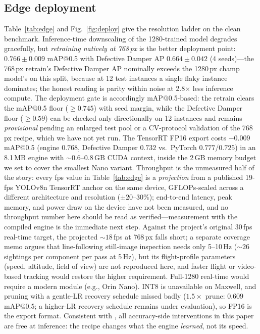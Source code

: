 \documentclass[conference]{IEEEtran}
\makeatletter
\newcommand{\dd}{Defective Damper}
\newcommand{\map}{mAP@0.5}
\makeatother
\begin{document}
\subsection{Edge deployment}
\label{sec:edge}
Table~\ref{tab:edge} and Fig.~\ref{fig:deploy} give the resolution ladder on the clean benchmark. Inference-time downscaling of the 1280-trained model degrades gracefully, but \emph{retraining natively at 768\,px} is the better deployment point: $0.766\pm0.009$ \map{} with \dd{} AP $0.664\pm0.042$ (4 seeds)---the 768\,px retrain's \dd{} AP nominally exceeds the 1280\,px champ model's on this split, because at 12 test instances a single flaky instance dominates; the honest reading is parity within noise at 2.8$\times$ less inference compute. The deployment gate is accordingly \map{}-based: the retrain clears the \map{} floor ($\geq0.745$) with seed margin, while the \dd{} floor ($\geq0.59$) can be checked only directionally on 12 instances and remains \emph{provisional} pending an enlarged test pool or a CV-protocol validation of the 768\,px recipe, which we have not yet run. The TensorRT FP16 export costs $-0.009$ \map{} (engine $0.768$, \dd{} $0.732$ vs.\ PyTorch $0.777$/$0.725$) in an 8.1\,MB engine with ${\sim}0.6$--$0.8$\,GB CUDA context, inside the 2\,GB memory budget we set to cover the smallest Nano variant. Throughput is the unmeasured half of the story: every fps value in Table~\ref{tab:edge} is a \emph{projection} from a published 19-fps YOLOv8n TensorRT anchor on the same device, GFLOPs-scaled across a different architecture and resolution (${\pm}20$--$30\%$); end-to-end latency, peak memory, and power draw on the device have not been measured, and no throughput number here should be read as verified---measurement with the compiled engine is the immediate next step. Against the project's original 30\,fps real-time target, the projected ${\sim}18$\,fps at 768\,px falls short; a separate coverage memo argues that line-following still-image inspection needs only 5--10\,Hz (${\sim}26$ sightings per component per pass at 5\,Hz), but its flight-profile parameters (speed, altitude, field of view) are not reproduced here, and faster flight or video-based tracking would restore the higher requirement. Full-1280 real-time would require a modern module (e.g., Orin Nano). INT8 is unavailable on Maxwell, and pruning with a gentle-LR recovery schedule missed badly ($1.5\times$ prune: $0.609$ \map{}; a higher-LR recovery schedule remains under evaluation), so FP16 is the export format. Consistent with \cite{vazquez2026wildfire}, all accuracy-side interventions in this paper are free at inference: the recipe changes what the engine \emph{learned}, not its speed.
\end{document}
